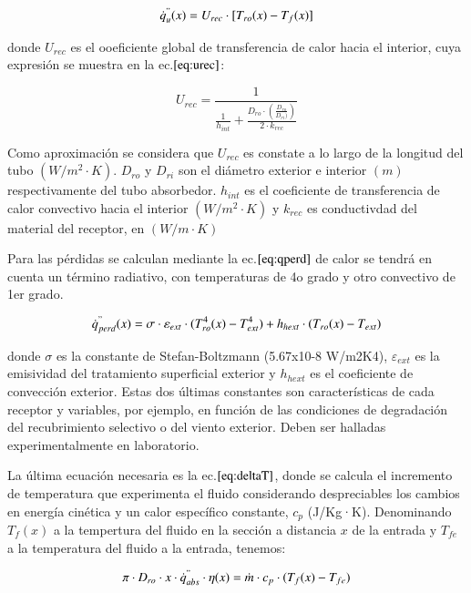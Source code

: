 \documentclass[12pt]{report} %
\begin{document}
\begin{equation}
    \dot{q}^{"}_{u}(x)= U_{rec} \cdot [T_{ro}(x)-T_{f}(x)] \label{eq:qu}
\end{equation}

donde \(U_{rec}\) es el ooeficiente global de transferencia de calor hacia el interior, cuya expresión se muestra en la ec.\(\eqref{eq:urec}\):

\begin{equation}
    U_{rec} = \frac{1}{\frac{1}{h_{int}} + \frac{D_{ro}\cdot(\frac{D_{ro}}{D_{ri})})}{2\cdot k_{rec}}} \label{eq:urec}
\end{equation}

Como aproximación se considera que \(U_{rec}\) es constate a lo largo de la longitud del tubo \((W/m^{2}\cdot K)\). \(D_{ro}\) y \(D_{ri}\) son el diámetro exterior e interior \((m)\) respectivamente del tubo absorbedor. \(h_{int}\) es el coeficiente de transferencia de calor convectivo hacia el interior \((W/m^{2}\cdot K)\) y \(k_{rec}\) es conductivdad del material del receptor, en \((W/m\cdot K)\)

Para las pérdidas se calculan mediante la ec.\(\eqref{eq:qperd}\) de calor se tendrá en cuenta un término radiativo, con temperaturas de 4o grado y otro convectivo de 1er grado. 

\begin{equation}
    \dot{q}^{"}_{perd}(x)= \sigma \cdot \varepsilon_{ext} \cdot (T_{ro}^{4}(x)-T_{ext}^{4}) + h_{hext} \cdot (T_{ro}(x)-T_{ext}) \label{eq:qperd}
\end{equation}

donde \(\sigma\) es la constante de Stefan-Boltzmann (5.67x10-8 W/m2K4), \(\varepsilon_{ext}\) es la emisividad del tratamiento superficial exterior y \(h_{hext}\) es el coeficiente de convección exterior. Estas dos últimas constantes son características de cada receptor y variables, por ejemplo, en función de las condiciones de degradación del recubrimiento selectivo o del viento exterior. Deben ser halladas experimentalmente en laboratorio.

La última ecuación necesaria es la ec.\(\eqref{eq:deltaT}\), donde se calcula el incremento de temperatura que experimenta el fluido considerando despreciables los cambios en energía cinética y un calor específico constante, \(c_{p}\) (J/Kg·K). Denominando \(T_{f}(x)\) a la tempertura del fluido en la sección a distancia \(x\) de la entrada y \(T_{fe}\) a la temperatura del fluido a la entrada, tenemos:

\begin{equation}
    \pi \cdot D_{ro} \cdot x \cdot \dot{q}^{"}_{abs} \cdot \eta(x)= \dot{m} \cdot c_{p} \cdot (T_{f}(x)-T_{fe}) \label{eq:deltaT}
\end{equation}\\
\end{document}
